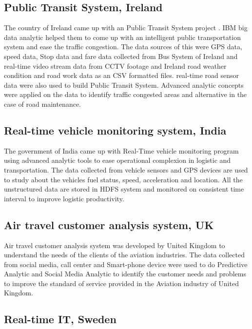 \documentclass[sigconf]{acmart}
\begin{document}
\subsection{Public Transit System, Ireland}

The country of Ireland came up with an Public Transit System project \cite{bdlt}. IBM big data analytic helped them to come up with an intelligent public transportation system and ease the traffic congestion. The data sources of this were GPS data, speed data, Stop data and fare data collected from Bus System of Ireland and real-time video stream data from CCTV footage and  Ireland road weather condition and road work data as an CSV formatted files. real-time road sensor data were also used to build Public Transit System. Advanced analytic concepts were applied on the data to identify traffic congested areas and alternative in the case of road maintenance. 

\subsection{Real-time vehicle monitoring system, India}

The government of India came up with Real-Time vehicle monitoring program \cite{bdlt} using advanced analytic tools to ease operational complexion in logistic and transportation. The data collected from vehicle sensors and GPS devices are used to study about the vehicles fuel status, speed, acceleration and location. All the unstructured data are stored in HDFS system and monitored on consistent time interval to improve logistic productivity.

\subsection{Air travel customer analysis system, UK}

Air travel customer analysis system \cite{bdlt} was developed by United Kingdom to understand the needs of the clients of the aviation industries. The data collected from social media, call center and Smart-phone device were used to do Predictive Analytic and Social Media Analytic to identify the customer needs and problems to improve the standard of service provided in the Aviation industry of United Kingdom.

\subsection{Real-time IT, Sweden}
\end{document}
